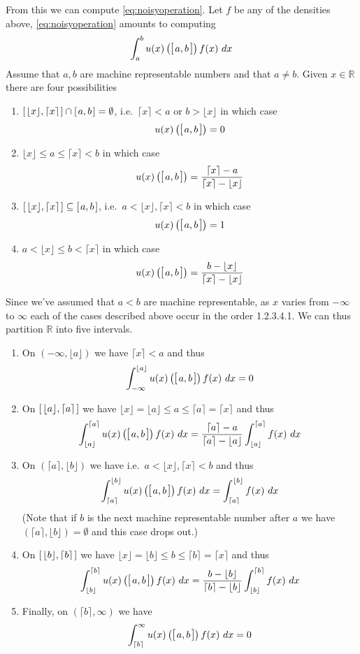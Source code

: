 \documentclass[10pt,a4paper]{article}
\newcommand{\R}{\mathbb{R}}
\newcommand{\ceil}[1]{\lceil #1 \rceil}
\newcommand{\floor}[1]{\lfloor #1 \rfloor}
\newcommand{\intvl}[1]{\mathlarger{\left[\right.}  #1 \mathlarger{\left.\right]}}
\newcommand{\fintvl}[1][x]{\intvl{\floor{#1},\ceil{#1}}}
\begin{document}
From this we can compute \eqref{eq:noisyoperation}. Let $f$ be any of the densities above, \eqref{eq:noisyoperation} amounts to computing
\[
\int_a^b u(x)\left(\intvl{a,b}\right) f(x) ~dx
\]
Assume that $a,b$ are machine representable numbers and that $a\neq b$. Given $x\in \R$ there are four possibilities
\begin{enumerate}
\item $\fintvl \cap \intvl{a,b}=\emptyset$, i.e.\ $\ceil{x}<a$ or $b>\floor{x}$ in which case 
\[
u(x)\left(\intvl{a,b}\right)=0
\]
\item  $\floor{x}\leq a\leq \ceil{x}<b$ in which case
\[
u(x)\left(\intvl{a,b}\right)=\frac{\ceil{x}-a}{\ceil{x}-\floor{x}}
\]
\item $\fintvl \subseteq \intvl{a,b}$, i.e.\ $a<\floor{x}, \ceil{x}<b$ in which case
\[
u(x)\left(\intvl{a,b}\right)=1
\]
\item  $a< \floor{x}\leq b<\ceil{x}$ in which case
\[
u(x)\left(\intvl{a,b}\right)=\frac{b-\floor{x}}{\ceil{x}-\floor{x}}
\]
\end{enumerate}
Since we've assumed that $a<b$ are machine representable, as $x$ varies from $-\infty$ to $\infty$ each of the cases described above occur in the order 1.2.3.4.1. We can thus partition $\R$ into five intervals. 
\begin{enumerate}
\item On $\left(-\infty,\floor{a}\right)$ we have $\ceil{x}<a$ and thus
\[
\int_{-\infty}^{\floor{a}} u(x)\left(\intvl{a,b}\right) f(x) ~dx=0
\]
\item On $\fintvl[a]$ we have $\floor{x}=\floor{a}\leq a\leq \ceil{a}=\ceil{x}$ and thus
\[
\int_{\floor{a}}^{\ceil{a}} u(x)\left(\intvl{a,b}\right) f(x) ~dx=\frac{\ceil{a}-a}{\ceil{a}-\floor{a}}\int_{\floor{a}}^{\ceil{a}}  f(x) ~dx
\]
\item On $\left(\ceil{a},\floor{b}\right)$ we have  i.e.\ $a<\floor{x}, \ceil{x}<b$ and thus
\[
\int_{\ceil{a}}^{\floor{b}} u(x)\left(\intvl{a,b}\right) f(x) ~dx=\int_{\ceil{a}}^{\floor{b}} f(x)~dx
\]
(Note that if $b$ is the next machine representable number after $a$ we have $\left(\ceil{a},\floor{b}\right)=\emptyset$ and this case drops out.)
\item On $\fintvl[b]$ we have $\floor{x}=\floor{b}\leq b\leq \ceil{b}=\ceil{x}$ and thus
\[
\int_{\floor{b}}^{\ceil{b}} u(x)\left(\intvl{a,b}\right) f(x) ~dx=\frac{b-\floor{b}}{\ceil{b}-\floor{b}}\int_{\floor{b}}^{\ceil{b}}  f(x) ~dx
\]
\item Finally, on $\left(\ceil{b},\infty\right)$ we have
\[
\int_{\ceil{b}}^{\infty} u(x)\left(\intvl{a,b}\right) f(x) ~dx=0
\]
\end{enumerate}
\end{document}
